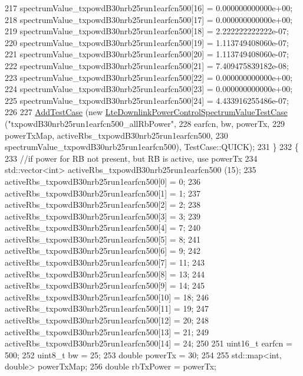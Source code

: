 \begin{DoxyCode}
217     spectrumValue\_txpowdB30nrb25run1earfcn500[16] = 0.000000000000e+00;
218     spectrumValue\_txpowdB30nrb25run1earfcn500[17] = 0.000000000000e+00;
219     spectrumValue\_txpowdB30nrb25run1earfcn500[18] = 2.222222222222e-07;
220     spectrumValue\_txpowdB30nrb25run1earfcn500[19] = 1.113749408060e-07;
221     spectrumValue\_txpowdB30nrb25run1earfcn500[20] = 1.113749408060e-07;
222     spectrumValue\_txpowdB30nrb25run1earfcn500[21] = 7.409475839182e-08;
223     spectrumValue\_txpowdB30nrb25run1earfcn500[22] = 0.000000000000e+00;
224     spectrumValue\_txpowdB30nrb25run1earfcn500[23] = 0.000000000000e+00;
225     spectrumValue\_txpowdB30nrb25run1earfcn500[24] = 4.433916255486e-07;
226 
227     \hyperlink{classns3_1_1TestCase_a3718088e3eefd5d6454569d2e0ddd835}{AddTestCase} (\textcolor{keyword}{new} \hyperlink{classLteDownlinkPowerControlSpectrumValueTestCase}{LteDownlinkPowerControlSpectrumValueTestCase}
       (\textcolor{stringliteral}{"txpowdB30nrb25run1earfcn500\_allRbPower"},
228                                                                    earfcn, bw, powerTx,
229                                                                    powerTxMap, 
      activeRbs\_txpowdB30nrb25run1earfcn500,
230                                                                    
      spectrumValue\_txpowdB30nrb25run1earfcn500), TestCase::QUICK);
231   \}
232   \{
233     \textcolor{comment}{//if power for RB not present, but RB is active, use powerTx}
234     std::vector<int> activeRbs\_txpowdB30nrb25run1earfcn500 (15);
235     activeRbs\_txpowdB30nrb25run1earfcn500[0] = 0;
236     activeRbs\_txpowdB30nrb25run1earfcn500[1] = 1;
237     activeRbs\_txpowdB30nrb25run1earfcn500[2] = 2;
238     activeRbs\_txpowdB30nrb25run1earfcn500[3] = 3;
239     activeRbs\_txpowdB30nrb25run1earfcn500[4] = 7;
240     activeRbs\_txpowdB30nrb25run1earfcn500[5] = 8;
241     activeRbs\_txpowdB30nrb25run1earfcn500[6] = 9;
242     activeRbs\_txpowdB30nrb25run1earfcn500[7] = 11;
243     activeRbs\_txpowdB30nrb25run1earfcn500[8] = 13;
244     activeRbs\_txpowdB30nrb25run1earfcn500[9] = 14;
245     activeRbs\_txpowdB30nrb25run1earfcn500[10] = 18;
246     activeRbs\_txpowdB30nrb25run1earfcn500[11] = 19;
247     activeRbs\_txpowdB30nrb25run1earfcn500[12] = 20;
248     activeRbs\_txpowdB30nrb25run1earfcn500[13] = 21;
249     activeRbs\_txpowdB30nrb25run1earfcn500[14] = 24;
250 
251     uint16\_t earfcn = 500;
252     uint8\_t bw = 25;
253     \textcolor{keywordtype}{double} powerTx = 30;
254 
255     std::map<int, double> powerTxMap;
256     \textcolor{keywordtype}{double} rbTxPower = powerTx;

\end{DoxyCode}
